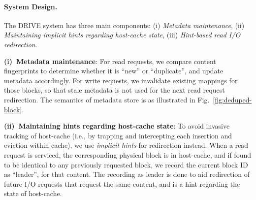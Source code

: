 \vspace{-0.2in}
\paragraph{System Design.} 
The DRIVE system has three main components: (i) \textit{Metadata maintenance},
(ii) \textit{Maintaining implicit hints regarding host-cache state}, 
(iii) \textit{Hint-based read I/O redirection}.

\textbf{(i)~Metadata maintenance}: 
For read requests,
we compare content fingerprints to determine whether it is ``new'' or ``duplicate'', and
update metadata accordingly. For write requests, we invalidate existing mappings for those
blocks, so that stale metadata is not used for the next read request redirection.
The semantics of metadata store is as illustrated 
in Fig.~\ref{fig:deduped-block}.

\textbf{(ii)~Maintaining hints regarding host-cache state}: 
To avoid invasive tracking of host-cache (i.e., by trapping and intercepting each 
insertion and eviction within cache), we use \textit{implicit hints}
for redirection instead. When a read request is serviced, the corresponding physical block is in
host-cache, and if found to be identical to any previously requested block, we record the current
block ID as ``leader'', for that content. The recording as leader is done to aid redirection of future
I/O requests that request the same content, and is a hint regarding the state of host-cache.

